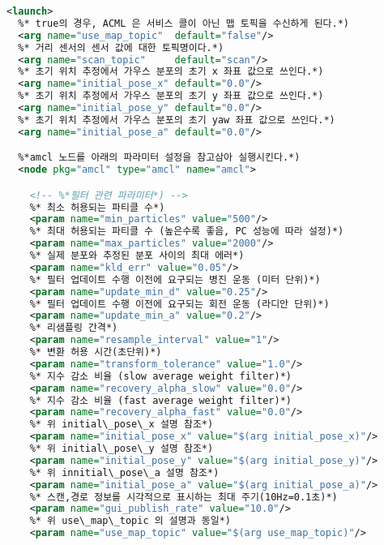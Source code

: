 \vspace{\baselineskip}
\begin{lstlisting}[language=XML]
<launch>
  %* true의 경우, ACML 은 서비스 콜이 아닌 맵 토픽을 수신하게 된다.*)
  <arg name="use_map_topic"  default="false"/>
  %* 거리 센서의 센서 값에 대한 토픽명이다.*) 
  <arg name="scan_topic"     default="scan"/>
  %* 초기 위치 추정에서 가우스 분포의 초기 x 좌표 값으로 쓰인다.*)
  <arg name="initial_pose_x" default="0.0"/>
  %* 초기 위치 추정에서 가우스 분포의 초기 y 좌표 값으로 쓰인다.*)
  <arg name="initial_pose_y" default="0.0"/> 
  %* 초기 위치 추정에서 가우스 분포의 초기 yaw 좌표 값으로 쓰인다.*)
  <arg name="initial_pose_a" default="0.0"/> 

  %*amcl 노드를 아래의 파라미터 설정을 참고삼아 실행시킨다.*)
  <node pkg="amcl" type="amcl" name="amcl"> 

    <!-- %*필터 관련 파라미터*) -->
    %* 최소 허용되는 파티클 수*)
    <param name="min_particles" value="500"/> 
    %* 최대 허용되는 파티클 수 (높은수록 좋음, PC 성능에 따라 설정)*)
    <param name="max_particles" value="2000"/>
    %* 실제 분포와 추정된 분포 사이의 최대 에러*)
    <param name="kld_err" value="0.05"/>
    %* 필터 업데이트 수행 이전에 요구되는 병진 운동 (미터 단위)*)
    <param name="update_min_d" value="0.25"/>
    %* 필터 업데이트 수행 이전에 요구되는 회전 운동 (라디안 단위)*)
    <param name="update_min_a" value="0.2"/>
    %* 리샘플링 간격*)
    <param name="resample_interval" value="1"/>
    %* 변환 허용 시간(초단위)*)
    <param name="transform_tolerance" value="1.0"/>
    %* 지수 감소 비율 (slow average weight filter)*)
    <param name="recovery_alpha_slow" value="0.0"/>
    %* 지수 감소 비율 (fast average weight filter)*)
    <param name="recovery_alpha_fast" value="0.0"/> 
    %* 위 initial\_pose\_x 설명 참조*)
    <param name="initial_pose_x" value="$(arg initial_pose_x)"/>
    %* 위 initial\_pose\_y 설명 참조*)
    <param name="initial_pose_y" value="$(arg initial_pose_y)"/>
    %* 위 innitial\_pose\_a 설명 참조*)
    <param name="initial_pose_a" value="$(arg initial_pose_a)"/>
    %* 스캔,경로 정보를 시각적으로 표시하는 최대 주기(10Hz=0.1초)*)
    <param name="gui_publish_rate" value="10.0"/> 
    %* 위 use\_map\_topic 의 설명과 동일*)
    <param name="use_map_topic" value="$(arg use_map_topic)"/> 


\end{lstlisting}
